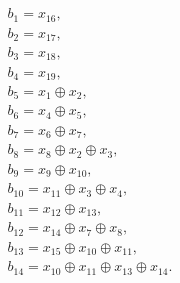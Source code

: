 \begin{multline} \\
b_1 = x_{16}, \\
b_2 = x_{17}, \\
b_3 = x_{18}, \\
b_4 = x_{19}, \\
b_5 = x_{1} \oplus x_{2}, \\
b_6 = x_{4} \oplus x_{5}, \\
b_7 = x_{6} \oplus x_{7}, \\
b_8 = x_{8} \oplus x_{2} \oplus x_{3}, \\
b_9 = x_{9} \oplus x_{10}, \\
b_{10} = x_{11} \oplus x_{3} \oplus x_{4}, \\
b_{11} = x_{12} \oplus x_{13}, \\
b_{12} = x_{14} \oplus x_{7} \oplus x_{8}, \\
b_{13} = x_{15} \oplus x_{10} \oplus x_{11}, \\
b_{14} = x_{10} \oplus x_{11} \oplus x_{13} \oplus x_{14}. \\
\end{multline}
